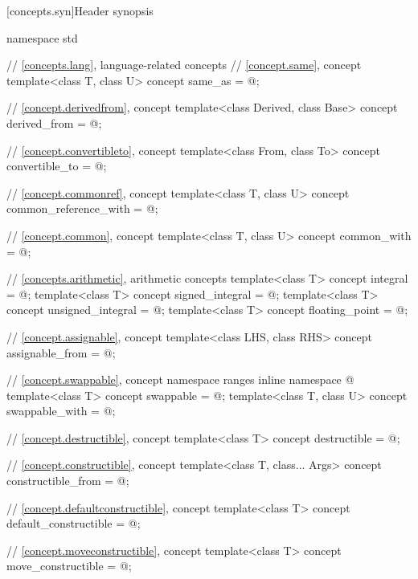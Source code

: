 [concepts.syn]{Header  synopsis}

%
\begin{codeblock}
namespace std {
  // \ref{concepts.lang}, language-related concepts
  // \ref{concept.same}, concept 
  template<class T, class U>
    concept same_as = @\seebelow@;

  // \ref{concept.derivedfrom}, concept 
  template<class Derived, class Base>
    concept derived_from = @\seebelow@;

  // \ref{concept.convertibleto}, concept 
  template<class From, class To>
    concept convertible_to = @\seebelow@;

  // \ref{concept.commonref}, concept 
  template<class T, class U>
    concept common_reference_with = @\seebelow@;

  // \ref{concept.common}, concept 
  template<class T, class U>
    concept common_with = @\seebelow@;

  // \ref{concepts.arithmetic}, arithmetic concepts
  template<class T>
    concept integral = @\seebelow@;
  template<class T>
    concept signed_integral = @\seebelow@;
  template<class T>
    concept unsigned_integral = @\seebelow@;
  template<class T>
    concept floating_point = @\seebelow@;

  // \ref{concept.assignable}, concept 
  template<class LHS, class RHS>
    concept assignable_from = @\seebelow@;

  // \ref{concept.swappable}, concept 
  namespace ranges {
    inline namespace @
  }
  template<class T>
    concept swappable = @\seebelow@;
  template<class T, class U>
    concept swappable_with = @\seebelow@;

  // \ref{concept.destructible}, concept 
  template<class T>
    concept destructible = @\seebelow@;

  // \ref{concept.constructible}, concept 
  template<class T, class... Args>
    concept constructible_from = @\seebelow@;

  // \ref{concept.defaultconstructible}, concept 
  template<class T>
    concept default_constructible = @\seebelow@;

  // \ref{concept.moveconstructible}, concept 
  template<class T>
    concept move_constructible = @\seebelow@;

}
\end{codeblock}

